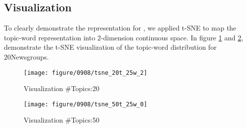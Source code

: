 \subsection{Visualization}
To clearly demonstrate the representation for , we applied t-SNE to map the topic-word representation into 2-dimension continuous space. In figure \ref{fig:tsne20t25w2} and \ref{fig:tsne50t25w0}, demonstrate the t-SNE visualization of the topic-word distribution for 20Newsgroups. 
\begin{figure}
\centering
\texttt{[image: figure/0908/tsne\_20t\_25w\_2]}
\caption{Visualization \#Topics:20}
\label{fig:tsne20t25w2}
\end{figure}
\begin{figure}
\centering
\texttt{[image: figure/0908/tsne\_50t\_25w\_0]}
\caption{Visualization \#Topics:50}
\label{fig:tsne50t25w0}
\end{figure}
